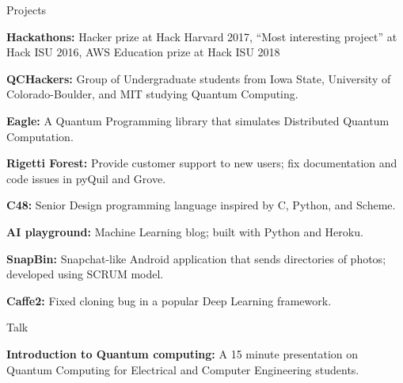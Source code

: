 \documentclass{resume} %
\begin{document}

\begin{rSection}{Projects}


{\bf Hackathons:} Hacker prize at Hack Harvard 2017, “Most interesting project” at Hack ISU 2016, AWS Education prize at Hack ISU 2018

{\bf QCHackers:}
Group of Undergraduate students from Iowa State, University of Colorado-Boulder, and MIT studying Quantum Computing.

{\bf Eagle:}
A Quantum Programming library that simulates Distributed Quantum Computation.

{\bf Rigetti Forest:}
Provide customer support to new users; fix documentation and code issues in pyQuil and Grove.

{\bf C48:}
Senior Design programming language inspired by C, Python, and Scheme.

{\bf AI playground:}
Machine Learning blog; built with Python and Heroku.

{\bf SnapBin:}
Snapchat-like Android application that sends directories of photos; developed using SCRUM model.

{\bf Caffe2:}
Fixed cloning bug in a popular Deep Learning framework.

\end{rSection}

\begin{rSection}{Talk}

{\bf Introduction to Quantum computing:}
A 15 minute presentation on Quantum Computing for Electrical and Computer Engineering students.

\end{rSection}



\end{document}
